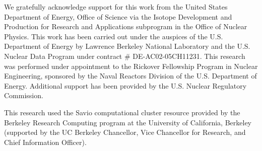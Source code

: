 \documentclass[3p]{elsarticle}
\newcommand{\comment}[1]{\todo[color=blue!20!white,inline]{ASV: #1}}
\begin{document}
We gratefully acknowledge support for this work from the United States Department of Energy, Office of Science via the Isotope Development and Production for Research and Applications subprogram in the Office of Nuclear Physics. 
This work has been carried out  under the auspices of the U.S. Department of Energy by  Lawrence Berkeley National Laboratory and the U.S. Nuclear Data Program under contract \# DE-AC02-05CH11231.
This research was performed under appointment to the Rickover Fellowship Program in Nuclear Engineering, sponsored by the Naval Reactors Division of the U.S. Department of Energy.
Additional support has been provided by the U.S. Nuclear Regulatory Commission.



 
This research used the Savio computational cluster resource provided by the Berkeley Research Computing program at the University of California, Berkeley (supported by the UC Berkeley Chancellor, Vice Chancellor for Research, and Chief Information Officer).

 


 
 

\end{document}
